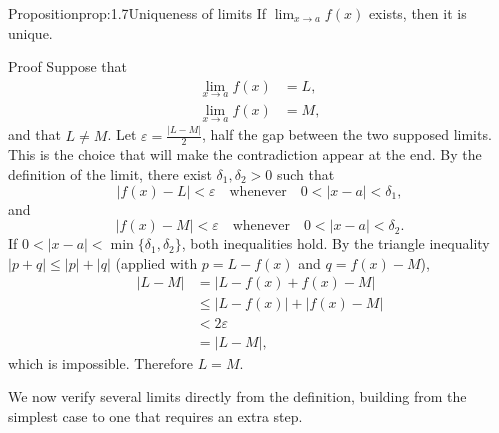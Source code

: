 \documentclass[a4paper,12pt,oneside]{memoir}
\begin{document}
\begin{envproposition}{Proposition}{prop:1.7}{Uniqueness of limits}
If \(\lim_{x \to a} f(x)\) exists, then it is unique.
\end{envproposition}
\begin{envproof}{Proof}{}{}
Suppose that \[ \begin{aligned} \lim_{x \to a} f(x) &= L,\\ \lim_{x \to a} f(x) &= M, \end{aligned} \] and that \(L \neq M\). Let \(\varepsilon = \tfrac{|L - M|}{2}\), half the gap between the two supposed limits. This is the choice that will make the contradiction appear at the end. By the definition of the limit, there exist \(\delta_{1}, \delta_{2} > 0\) such that \[ |f(x) - L| < \varepsilon \quad \text{whenever} \quad 0 < |x - a| < \delta_{1}, \] and \[ |f(x) - M| < \varepsilon \quad \text{whenever} \quad 0 < |x - a| < \delta_{2}. \] If \(0 < |x - a| < \min\{\delta_{1}, \delta_{2}\}\), both inequalities hold. By the triangle inequality \(|p + q| \le |p| + |q|\) (applied with \(p = L - f(x)\) and \(q = f(x) - M\)), \[ \begin{aligned} |L - M| &= |L - f(x) + f(x) - M|\\ &\le |L - f(x)| + |f(x) - M|\\ &< 2\varepsilon\\ &= |L - M|, \end{aligned} \] which is impossible. Therefore \(L = M\).
\end{envproof}
We now verify several limits directly from the definition, building from the simplest case to one that requires an extra step.
\end{document}
